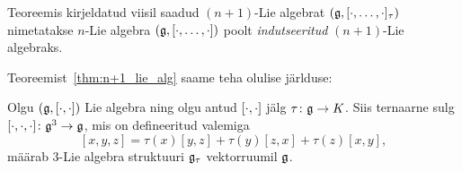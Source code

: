 
Teoreemis kirjeldatud viisil saadud $(n+1)$-Lie algebrat
$(\mathfrak{g}, [\cdot, \dots, \cdot]_\tau)$ nimetatakse $n$-Lie algebra
$(\mathfrak{g}, [\cdot, \dots, \cdot])$ poolt \emph{indutseeritud}
$(n+1)$-Lie algebraks.

Teoreemist~\ref{thm:n+1_lie_alg} saame teha olulise järlduse:

\begin{jar}
    Olgu $(\mathfrak{g}, \left[ \cdot, \cdot \right])$ Lie algebra ning olgu antud
    $\left[ \cdot, \cdot \right]$ jälg $\tau \colon \mathfrak{g} \to K$. Siis ternaarne sulg
    $[ \cdot, \cdot, \cdot ] \colon \mathfrak{g}^3 \to \mathfrak{g}$, mis on defineeritud
    valemiga
    \[
        [x, y, z] = \tau(x)[y, z] + \tau(y)[z, x] + \tau(z)[x, y],
    \]
    määrab $3$-Lie algebra struktuuri $\mathfrak{g}_\tau$ vektorruumil $\mathfrak{g}$.
\end{jar}

